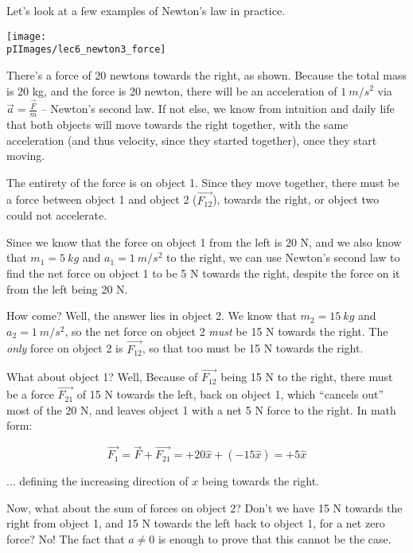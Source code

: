 Let's look at a few examples of Newton's law in practice.

\begin{center}
\texttt{[image: \\pIImages/lec6\_newton3\_force]}
\end{center}

There's a force of 20 newtons towards the right, as shown. Because the total mass is 20 kg, and the force is 20 newton, there will be an acceleration of $\SI{1}{m/s^2}$ via $\displaystyle \vec{a} = \frac{\vec{F}}{m}$ -- Newton's second law. If not else, we know from intuition and daily life that both objects will move towards the right together, with the same acceleration (and thus velocity, since they started together), once they start moving.

The entirety of the force is on object 1. Since they move together, there must be a force between object 1 and object 2 ($\vec{F_{12}}$), towards the right, or object two could not accelerate.

Since we know that the force on object 1 from the left is 20 N, and we also know that $m_1 = \SI{5}{kg}$ and $a_1 = \SI{1}{m/s^2}$ to the right, we can use Newton's second law to find the net force on object 1 to be 5 N towards the right, despite the force on it from the left being 20 N.

How come? Well, the answer lies in object 2. We know that $m_2 = \SI{15}{kg}$ and $a_2 = \SI{1}{m/s^2}$, so the net force on object 2 \emph{must} be 15 N towards the right. The \emph{only} force on object 2 is $\vec{F_{12}}$, so that too must be 15 N towards the right.

What about object 1? Well, Because of $\vec{F_{12}}$ being 15 N to the right, there must be a force $\vec{F_{21}}$ of 15 N towards the left, back on object 1, which ``cancels out'' most of the 20 N, and leaves object 1 with a net 5 N force to the right. In math form:

\begin{equation}
\vec{F_1} = \vec{F} + \vec{F_{21}} = +20\hat{x} + (-15\hat{x}) = +5 \hat{x}
\end{equation}

... defining the increasing direction of $x$ being towards the right.

Now, what about the sum of forces on object 2? Don't we have 15 N towards the right from object 1, and 15 N towards the left back to object 1, for a net zero force? No! The fact that $a \neq 0$ is enough to prove that this cannot be the case.

